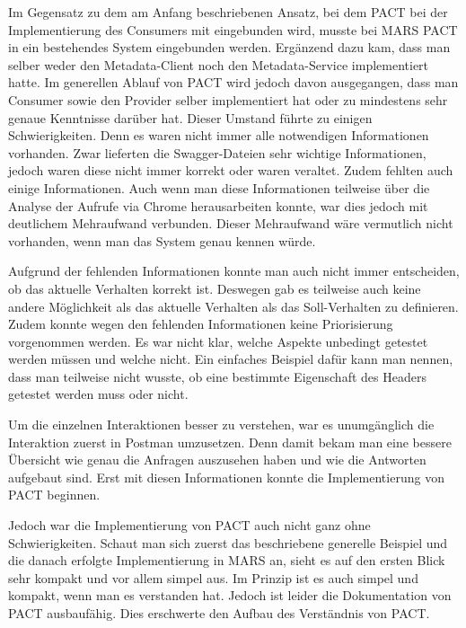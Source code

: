 \documentclass{llncs}
\begin{document}
Im Gegensatz zu dem am Anfang beschriebenen Ansatz, bei dem PACT bei der Implementierung des Consumers mit eingebunden wird, musste bei MARS PACT in ein bestehendes System eingebunden werden. Ergänzend dazu kam, dass man selber weder den Metadata-Client noch den Metadata-Service implementiert hatte. Im generellen Ablauf von PACT wird jedoch davon ausgegangen, dass man Consumer sowie den Provider selber implementiert hat oder zu mindestens sehr genaue Kenntnisse darüber hat. Dieser Umstand führte zu einigen Schwierigkeiten.
Denn es waren nicht immer alle notwendigen Informationen vorhanden. Zwar lieferten die Swagger-Dateien sehr wichtige Informationen, jedoch waren diese nicht immer korrekt oder waren veraltet. Zudem fehlten auch einige Informationen. Auch wenn man diese Informationen teilweise über die Analyse der Aufrufe via Chrome herausarbeiten konnte, war dies jedoch mit deutlichem Mehraufwand verbunden. Dieser Mehraufwand wäre vermutlich nicht vorhanden, wenn man das System genau kennen würde.

Aufgrund der fehlenden Informationen konnte man auch nicht immer entscheiden, ob das aktuelle Verhalten korrekt ist. Deswegen gab es teilweise auch keine andere Möglichkeit als das aktuelle Verhalten als das Soll-Verhalten zu definieren. Zudem konnte wegen den fehlenden Informationen keine Priorisierung vorgenommen werden. Es war nicht klar, welche Aspekte unbedingt getestet werden müssen und welche nicht. Ein einfaches Beispiel dafür kann man nennen, dass man teilweise nicht wusste, ob eine bestimmte Eigenschaft des Headers getestet werden muss oder nicht.

Um die einzelnen Interaktionen besser zu verstehen, war es unumgänglich die Interaktion zuerst in Postman umzusetzen. Denn damit bekam man eine bessere Übersicht wie genau die Anfragen auszusehen haben und wie die Antworten aufgebaut sind. Erst mit diesen Informationen konnte die Implementierung von PACT beginnen.

Jedoch war die Implementierung von PACT auch nicht ganz ohne Schwierigkeiten. Schaut man sich zuerst das beschriebene generelle Beispiel und die danach erfolgte Implementierung in MARS an, sieht es auf den ersten Blick sehr kompakt und vor allem simpel aus. Im Prinzip ist es auch simpel und kompakt, wenn man es verstanden hat. Jedoch ist leider die Dokumentation von PACT ausbaufähig. Dies erschwerte den Aufbau des Verständnis von PACT.
\end{document}

